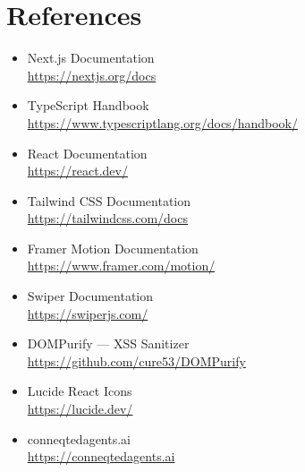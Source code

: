 \documentclass[12pt, oneside, a4paper]{book}
\begin{document}
\backmatter
\cleardoublepage

\chapter*{References}

\begin{itemize}
  \item Next.js Documentation\\
  \url{https://nextjs.org/docs}

  \item TypeScript Handbook\\
  \url{https://www.typescriptlang.org/docs/handbook/}

  \item React Documentation\\
  \url{https://react.dev/}

  \item Tailwind CSS Documentation\\
  \url{https://tailwindcss.com/docs}

  \item Framer Motion Documentation\\
  \url{https://www.framer.com/motion/}

  \item Swiper Documentation\\
  \url{https://swiperjs.com/}

  \item DOMPurify --- XSS Sanitizer\\
  \url{https://github.com/cure53/DOMPurify}

  \item Lucide React Icons\\
  \url{https://lucide.dev/}

  \item conneqtedagents.ai\\
  \url{https://conneqtedagents.ai}
\end{itemize}


\cleardoublepage
{}

\end{document}
